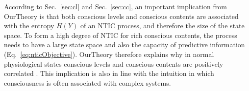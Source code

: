 \documentclass[utf8]{article}
\begin{document}
    	    
    	    According to Sec.~\ref{sec:cl} and Sec.~\ref{sec:cc}, an important implication from \ac{OurTheory} is that both conscious levels and conscious contents are associated with the entropy $H(Y)$ of an NTIC process, and therefore the size of the state space. To form a high degree of NTIC for rich conscious contents, the process needs to have a large state space and also the capacity of predictive information   (Eq.~\ref{eq:nticObjective}).
    	    \ac{OurTheory} therefore explains why in normal physiological states conscious levels and conscious contents are positively correlated \citep{laureys2005neural}. This implication is also in line with the intuition in which consciousness is often associated with complex systems.
    			
    
    
\end{document}
